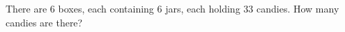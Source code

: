 There are $6$ boxes, each containing $6$ jars, each holding $33$ candies. How many candies are there?
